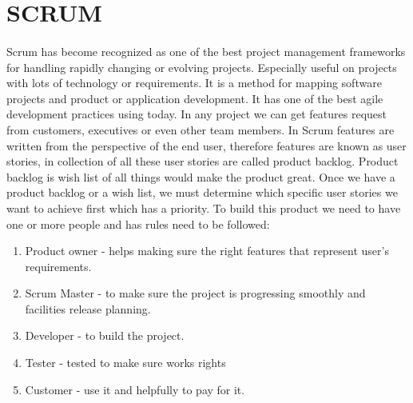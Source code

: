 \documentclass[12pt,a4paper,class,twoside,openany]{report}
\begin{document}
\section{SCRUM}
 \paragraph*{\hspace{.9 cm} } Scrum has become recognized as one of the best project management frameworks for handling rapidly changing or evolving projects. Especially useful on projects with lots of technology or requirements. It is a method for mapping software projects and product or application development. It has one of the best agile development practices using today. In any project we can get features request from customers, executives or even other team members. In Scrum features are written from the perspective of the end user, therefore features are known as user stories, in collection of all these user stories are called product backlog. Product backlog is wish list of all things would make the product great. Once we have a product backlog or a wish list, we must determine which specific user stories we want to achieve first which has a priority.  
To build this product we need to have one or more people and has rules need to be followed:
\begin{enumerate}
\item Product owner - helps making  sure the right features that represent user's requirements.
\item Scrum Master - to make sure the project is progressing smoothly and facilities release planning.
\item Developer - to build the project.
\item Tester - tested to make sure works rights
\item Customer - use it and helpfully to pay for it.
\end{enumerate}
\end{document}
